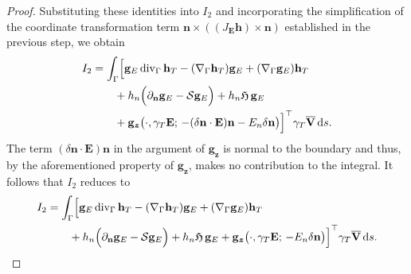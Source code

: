 \documentclass[12pt,reqno]{amsart}
\theoremstyle{definition}
\numberwithin{equation}{section}
\begin{document}
\begin{proof}
Substituting these identities into $I_2$ and incorporating the simplification of the coordinate transformation term $\mathbf{n}\times((J_{\mathbf{E}}\mathbf{h})\times\mathbf{n})$ established in the previous step, we obtain
\[
\begin{aligned}
I_2 &= \int_\Gamma \Bigl[ \mathbf{g}_E \operatorname{div}_\Gamma\mathbf{h}_T - (\nabla_\Gamma\mathbf{h}_T)\mathbf{g}_E + (\nabla_\Gamma\mathbf{g}_E)\mathbf{h}_T \\
&\qquad + h_n \Bigl( \partial_{\mathbf{n}}\mathbf{g}_E - \mathcal{S}\mathbf{g}_E \Bigr) + h_n \mathfrak{H}\,\mathbf{g}_E \\
&\qquad + \mathbf{g}_{\boldsymbol{z}} \bigl( \cdot, \gamma_T\mathbf{E};\, -(\delta\mathbf{n}\cdot\mathbf{E})\mathbf{n} - E_n\delta\mathbf{n} \bigr) \Bigr]^{\top} \gamma_T\overline{\mathbf{V}} \, \mathrm{d}s.
\end{aligned}
\]
The term $(\delta\mathbf{n}\cdot\mathbf{E})\mathbf{n}$ in the argument of $\mathbf{g}_{\boldsymbol{z}}$ is normal to the boundary and thus, by the aforementioned property of $\mathbf{g}_{\boldsymbol{z}}$, makes no contribution to the integral. It follows that $I_2$ reduces to
\begin{equation}
\label{eq:I2_refined}
\begin{aligned}
I_2 &= \int_\Gamma \Bigl[ \mathbf{g}_E \operatorname{div}_\Gamma\mathbf{h}_T - (\nabla_\Gamma\mathbf{h}_T)\mathbf{g}_E + (\nabla_\Gamma\mathbf{g}_E)\mathbf{h}_T \\
&\qquad + h_n \Bigl( \partial_{\mathbf{n}}\mathbf{g}_E - \mathcal{S}\mathbf{g}_E \Bigr) + h_n \mathfrak{H}\,\mathbf{g}_E + \mathbf{g}_{\boldsymbol{z}} \bigl( \cdot, \gamma_T\mathbf{E};\, -E_n\delta\mathbf{n} \bigr) \Bigr]^{\top} \gamma_T\overline{\mathbf{V}} \, \mathrm{d}s.
\end{aligned}
\end{equation}


\end{proof}
\end{document}
